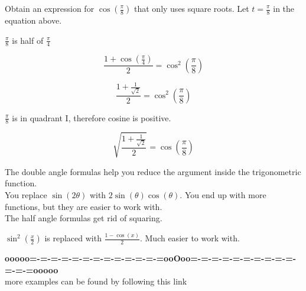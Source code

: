 \documentclass{ximera}
\begin{document}
\begin{example}

Obtain an expression for $\cos\left(  \frac{\pi}{8}  \right)$ that only uses square roots.
Let $t = \frac{\pi}{8}$ in the equation above.



\begin{explanation}

$\frac{\pi}{8}$ is half of $\frac{\pi}{4}$




\[   \frac{1 + \cos( \frac{\pi}{4} )}{2}  =   \cos^2\left( \frac{\pi}{8} \right)  \]


\[   \frac{1 + \frac{1}{\sqrt{2}}}{2}  =   \cos^2\left( \frac{\pi}{8} \right)  \]



$\frac{\pi}{8}$ is in quadrant I, therefore cosine is positive.




\[   \sqrt{ \frac{1 + \frac{1}{\sqrt{2}}}{2} }  =   \cos\left( \frac{\pi}{8} \right)  \]





\end{explanation}

\end{example}


The double angle formulas help you reduce the argument inside the trigonometric function. \\


You replace $\sin(2 \theta)$ with $2 \sin(\theta) \cos(\theta)$.  You end up with more functions, but they are easier to work with. \\


The half angle formulas get rid of squaring.


$\sin^2\left( \tfrac{x}{2} \right)$ is replaced with $\frac{1 - \cos(x)}{2}$.  Much easier to work with.















\begin{center}
\textbf{\textcolor{green!50!black}{ooooo=-=-=-=-=-=-=-=-=-=-=-=-=ooOoo=-=-=-=-=-=-=-=-=-=-=-=-=ooooo}} \\

more examples can be found by following this link\\ 

\end{center}
\end{document}
